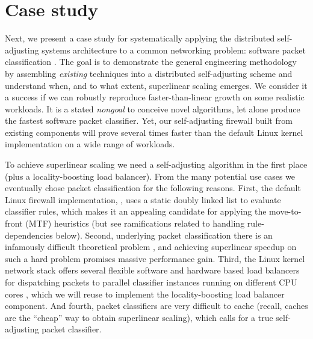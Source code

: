 \section{Case study }\label{sec:case-study}

Next, we present a case study for systematically applying the distributed self-adjusting systems architecture to a common networking problem: software packet classification \cite{gupta2001algorithms}. The goal is to demonstrate the general engineering methodology by assembling \emph{existing} techniques into a distributed self-adjusting scheme and understand when, and to what extent, superlinear scaling emerges. We consider it a success if we can robustly reproduce faster-than-linear growth on some realistic workloads. It is a stated \emph{nongoal} to conceive novel algorithms, let alone produce the fastest software packet classifier. %
Yet, our self-adjusting firewall built from existing components will prove several times faster than the default Linux kernel implementation on a wide range of workloads.

To achieve superlinear scaling we need a self-adjusting algorithm in the first place (plus a locality-boosting load balancer). From the many potential use cases %
\cite{SleatorT85Splay, BentleyCL93, HesterH85, HesterH85, BentleySTW86, Avin0020, ParkM12} we eventually chose packet classification for the following reasons.  First, the default Linux firewall implementation, \nftables, uses a static doubly linked list to evaluate classifier rules, which makes it an appealing candidate for applying the move-to-front (MTF) heuristics (but see ramifications related to handling rule-dependencies below). %
Second, underlying packet classification there is an infamously difficult theoretical problem \cite{10.1145/2619239.2626294,10.1006/jagm.1996.0063, PacutVAPRS2022, 10.1145/2619239.2626294, 10.1145/1851182.1851208, 10.1145/863955.863980, gupta2001algorithms}, %
and achieving superlinear speedup on such a hard problem promises massive performance gain. Third, the Linux kernel network stack offers several flexible software and hardware based load balancers for dispatching packets to parallel classifier instances running on different CPU cores \cite{rss-linux}, which we will reuse to implement the locality-boosting load balancer component. And fourth, packet classifiers are very difficult to cache \cite{1354643} (recall, caches are the ``cheap'' way to obtain superlinear scaling), which calls for a true self-adjusting packet classifier. %

